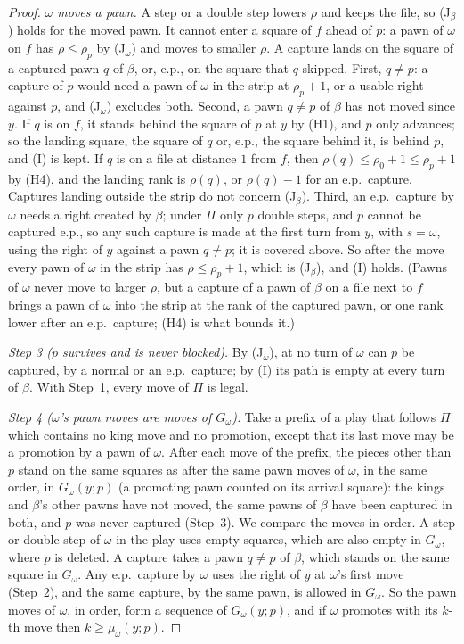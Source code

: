 \begin{proof}
\emph{$\omega$ moves a pawn.} A step or a double step lowers $\rho$ and keeps the file, so (J$_\beta$) holds for the
moved pawn. It cannot enter a square of $f$ ahead of $p$: a pawn of $\omega$ on $f$ has $\rho\le\rho_p$ by (J$_\omega$)
and moves to smaller $\rho$. A capture lands on the square of a captured pawn $q$ of $\beta$, or, e.p., on the square that
$q$ skipped. First, $q\ne p$: a capture of $p$ would need a pawn of $\omega$ in the strip at $\rho_p+1$, or a usable
right against $p$, and (J$_\omega$) excludes both. Second, a pawn $q\ne p$ of $\beta$ has not moved since $y$. If $q$ is on
$f$, it stands behind the square of $p$ at $y$ by (H1), and $p$ only advances; so the landing square, the square of $q$
or, e.p., the square behind it, is behind $p$, and (I) is kept. If $q$ is on a file at distance $1$ from $f$, then
$\rho(q)\le\rho_0+1\le\rho_p+1$ by (H4), and the landing rank is $\rho(q)$, or $\rho(q)-1$ for an e.p.\ capture. Captures
landing outside the strip do not concern (J$_\beta$). Third, an e.p.\ capture by $\omega$ needs a right created by
$\beta$; under $\Pi$ only $p$ double steps, and $p$ cannot be captured e.p., so any such capture is made at the first turn
from $y$, with $s=\omega$, using the right of $y$ against a pawn $q\ne p$; it is covered above. So after the move every pawn of
$\omega$ in the strip has $\rho\le\rho_p+1$, which is (J$_\beta$), and (I) holds. (Pawns of $\omega$ never move to
larger $\rho$, but a capture of a pawn of $\beta$ on a file next to $f$ brings a pawn of $\omega$ into the strip at the
rank of the captured pawn, or one rank lower after an e.p.\ capture; (H4) is what bounds it.)

\emph{Step 3 ($p$ survives and is never blocked).} By (J$_\omega$), at no turn of $\omega$ can $p$ be captured, by a
normal or an e.p.\ capture; by (I) its path is empty at every turn of $\beta$. With Step~1, every move of $\Pi$ is legal.

\emph{Step 4 ($\omega$'s pawn moves are moves of $G_\omega$).} Take a prefix of a play that follows $\Pi$ which contains no king
move and no promotion, except that its last move may be a promotion by a pawn of $\omega$. After each move of the prefix, the pieces other than $p$ stand on the same
squares as after the same pawn moves of $\omega$, in the same order, in $G_\omega(y;p)$ (a promoting pawn counted on its arrival square): the kings and $\beta$'s other
pawns have not moved, the same pawns of $\beta$ have been captured in both, and $p$ was never captured (Step~3). We
compare the moves in order. A step or double step of $\omega$ in the play uses empty squares, which are also empty in
$G_\omega$, where $p$ is deleted. A capture takes a pawn $q\ne p$ of $\beta$, which stands on the same square in
$G_\omega$. Any e.p.\ capture by $\omega$ uses the right of $y$ at $\omega$'s first move (Step~2), and the same capture,
by the same pawn, is allowed in $G_\omega$. So the pawn moves of $\omega$, in order, form a sequence of
$G_\omega(y;p)$, and if $\omega$ promotes with its $k$-th move then $k\ge\mu_\omega(y;p)$.


\end{proof}
